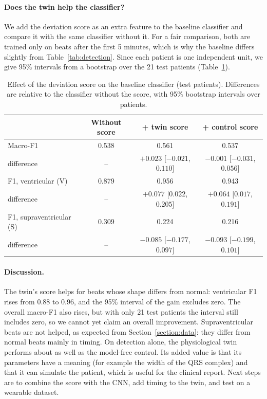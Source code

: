 \paragraph{Does the twin help the classifier?} We add the deviation score as an extra feature to the baseline classifier and compare it with the same classifier without it. For a fair comparison, both are trained only on beats after the first 5 minutes, which is why the baseline differs slightly from Table~\ref{tab:detection}. Since each patient is one independent unit, we give 95\% intervals from a bootstrap over the 21 test patients (Table~\ref{tab:ablation}).

\begin{table}[H]
\caption{Effect of the deviation score on the baseline classifier (test patients). Differences are relative to the classifier without the score, with 95\% bootstrap intervals over patients.}
\label{tab:ablation}
\centering
\small
{}
\begin{tabular}{@{}lccc@{}}
\toprule
 & \textbf{Without score} & \textbf{+ twin score} & \textbf{+ control score} \\
\midrule
Macro-F1 & 0.538 & 0.561 & 0.537 \\
\quad difference & -- & $+0.023$ [$-0.021$, $0.110$] & $-0.001$ [$-0.031$, $0.056$] \\
F1, ventricular (V) & 0.879 & 0.956 & 0.943 \\
\quad difference & -- & $+0.077$ [$0.022$, $0.205$] & $+0.064$ [$0.017$, $0.191$] \\
F1, supraventricular (S) & 0.309 & 0.224 & 0.216 \\
\quad difference & -- & $-0.085$ [$-0.177$, $0.097$] & $-0.093$ [$-0.199$, $0.101$] \\
\bottomrule
\end{tabular}
\end{table}

\paragraph{Discussion.} The twin's score helps for beats whose shape differs from normal: ventricular F1 rises from 0.88 to 0.96, and the 95\% interval of the gain excludes zero. The overall macro-F1 also rises, but with only 21 test patients the interval still includes zero, so we cannot yet claim an overall improvement. Supraventricular beats are not helped, as expected from Section~\ref{section:data}: they differ from normal beats mainly in timing. On detection alone, the physiological twin performs about as well as the model-free control. Its added value is that its parameters have a meaning (for example the width of the QRS complex) and that it can simulate the patient, which is useful for the clinical report. Next steps are to combine the score with the CNN, add timing to the twin, and test on a wearable dataset.
